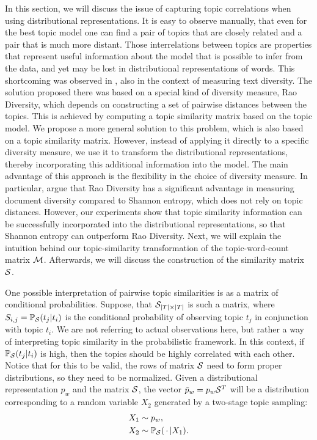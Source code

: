 In this section, we will discuss the issue of capturing topic
correlations when using distributional representations. It is easy to
observe manually, that even for the best topic model one can find a
pair of topics that are closely related and a pair that is much more
distant. Those interrelations between topics are 
properties that represent useful information about the model that is
possible to infer from the data, and yet
may be lost in distributional representations of words. 
This shortcoming was observed in \cite{bache:2013},
also in the context of measuring text diversity. The solution proposed
there was based on a special kind of diversity measure, Rao Diversity,
which depends on constructing a set of pairwise distances between the
topics. This is achieved by computing a topic similarity matrix based on
the topic model. We propose a more general solution to this problem,
which is also based on a topic similarity matrix. However, instead of
applying it directly to a specific diversity measure, we use it to
transform the distributional representations, thereby incorporating this
additional information into the model. The main advantage of this
approach is the flexibility in the choice of diversity measure. In
particular, \cite{bache:2013} argue that Rao Diversity has a
significant advantage in measuring document diversity compared to
Shannon entropy, which does not rely on topic distances. However, our
experiments show that topic similarity information can be successfully
incorporated into the distributional representations, so that Shannon
entropy can outperform Rao Diversity.  Next, we will explain the
intuition behind our topic-similarity transformation of the
topic-word-count matrix ${\mathcal M}$. Afterwards, we will discuss the
construction of the similarity matrix ${\mathcal S}$.

One possible interpretation of pairwise topic similarities is as a
matrix of conditional probabilities. Suppose, that ${\mathcal S}_{|T|\times|T|}$ is
such a matrix, where $S_{i,j}={\mathbb P}_{\mathcal S}(t_j|t_i)$ is the conditional
probability of observing topic $t_j$ in conjunction with topic $t_i$. We are not
referring to actual observations here, but rather a way of interpreting
topic similarity in the probabilistic framework. In this context, if
${\mathbb P}_{\mathcal S}(t_j|t_i)$ is high, then the topics should be highly correlated with
each other. Notice that for this to be valid, the rows of matrix ${\mathcal S}$
need to form proper distributions, so they need to be normalized.  
Given a distributional representation $p_w$ and the matrix
${\mathcal S}$, the vector $\tilde{p}_w=p_w {\mathcal S}^T$ will be a distribution
corresponding to a random variable $X_2$ generated by a two-stage
topic sampling:
\begin{align*}
X_1&\sim p_w,\\
X_2&\sim {\mathbb P}_{\mathcal S}(\,\cdot\,|X_1).
\end{align*}

